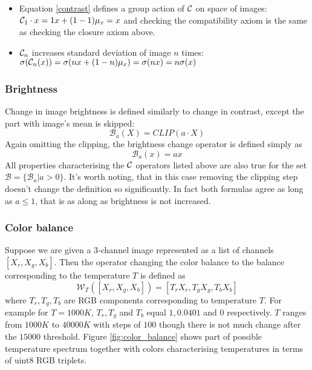 \begin{itemize}
            \item Equation \ref{contrast} defines a group action of $\mathcal{C}$ on space of images:
                $\mathcal{C}_1 \cdot x = 1x + (1-1)\mu_x = x$ and checking the compatibility axiom
                is the same as checking the closure axiom above.
            \item $\mathcal{C}_n$ increases standard deviation of image $n$ times:\\
                $\sigma(\mathcal{C}_n(x)) = \sigma(nx + (1-n)\mu_x) = \sigma(nx) = n\sigma(x)$
        \end{itemize}


    \subsubsection{Brightness}
        Change in image brightness is defined similarly to change in contrast, except
        the part with image's mean is skipped:
        $$ \mathcal{B}_a(X) = \mathit{CLIP}\left(a\cdot X\right) $$
        Again omitting the clipping, the brightness change operator is defined simply as
        \begin{equation}
            \mathcal{B}_a(x) = ax
        \end{equation}
        All properties characterising the $\mathcal{C}$ operators listed above
        are also true for the set $\mathcal{B} = \{\mathcal{B}_a | a>0 \}$.
        It's worth noting, that in this case removing the clipping step doesn't change
        the definition so significantly. In fact both formulas agree as long as $a\leq 1$,
        that is as along as brightness is not increased.
    \subsubsection{Color balance}
        Suppose we are given a 3-channel image represented as a list of channels
        $\left[ X_r, X_g, X_b\right]$. Then the operator changing the color balance
        to the balance corresponding to the temperature $T$ is defined as
        \begin{equation}
            \mathcal{W}_T \left(\left[ X_r, X_g, X_b \right]\right) =
            \left[T_r X_r, T_g X_g, T_b X_b \right]
        \end{equation}
        where $T_r, T_g, T_b$ are RGB components corresponding to temperature $T$.
        For example for $T=1000K$, $T_r, T_g$ and $T_b$ equal $1, 0.0401$ and $0$ respectively.
        $T$ ranges from $1000K$ to $40000K$ with steps of $100$
        though there is not much change after the $15000$ threshold.
        Figure \ref{fig:color_balance} shows part of possible temperature spectrum
        together with colors characterising temperatures in terms of uint8 RGB triplets.

